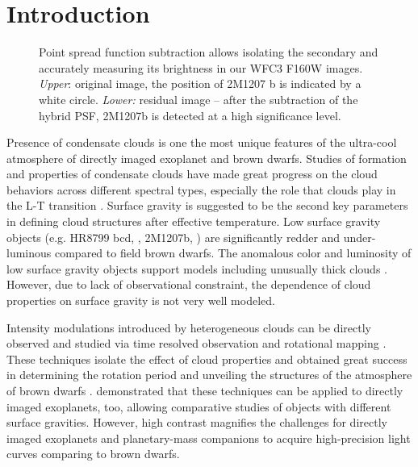 \documentclass[apj]{emulateapj}
\begin{document}
\section{Introduction}

\begin{figure}
  \centering
  \caption{Point spread function subtraction allows isolating the
    secondary and accurately measuring its brightness in our WFC3
    F160W images. {\em Upper}: original image, the position of 2M1207
    b is indicated by a white circle.  {\em Lower:} residual image --
    after the subtraction of the hybrid PSF, 2M1207b is detected at a
    high significance level.}
  \label{fig:1}
\end{figure}

Presence of condensate clouds is one the most unique features of the
ultra-cool atmosphere of directly imaged exoplanet and brown
dwarfs. Studies of formation and properties of condensate clouds
\citep[e.g.][]{Ackerman2001, Burrows2006a, Helling2008, Allard2012}
have made great progress on the cloud behaviors across different
spectral types, especially the role that clouds play in the L-T
transition \citep[e.g.][]{Burrows2006a, Marley2010}.  Surface gravity
is suggested to be the second key parameters in defining cloud
structures \citep[e.g.][]{Marley2012} after effective temperature. Low
surface gravity objects (e.g. HR8799 bcd, \cite{Marois2008a}, 2M1207b, \cite{Chauvin2004}) are significantly redder and under-luminous
compared to field brown dwarfs.  The anomalous color and luminosity of
low surface gravity objects support models including unusually thick
clouds \citep{Currie2011, Madhusudhan2011,Skemer2011,
  Skemer2012}. However, due to lack of observational constraint, the
dependence of cloud properties on surface gravity is not very well
modeled.

Intensity modulations introduced by heterogeneous clouds can be
directly observed and studied via time resolved observation and
rotational mapping \citep[e.g.][]{Apai2013,Buenzli2012,Buenzli2015,Burgasser2013,Radigan2012,Yang2015,Metchev2015,Heinze2015}. These techniques isolate the effect of cloud
properties and obtained great success in determining the rotation
period and unveiling the structures of the atmosphere of brown dwarfs
. \citet{Kostov2013}
demonstrated that these techniques can be applied to directly imaged
exoplanets, too, allowing comparative studies of objects with
different surface gravities. However, high contrast magnifies the
challenges for directly imaged exoplanets and planetary-mass
companions to acquire high-precision light curves comparing to brown
dwarfs.
\end{document}
